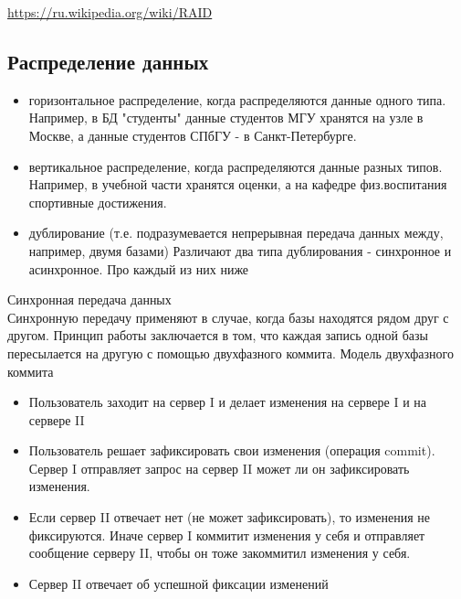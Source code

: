 \url{https://ru.wikipedia.org/wiki/RAID}

\subsection {Распределение данных}

\begin{itemize}
\item горизонтальное распределение, когда распределяются данные одного типа. Например, в БД "студенты" данные студентов МГУ хранятся на узле в Москве, а данные студентов СПбГУ - в Санкт-Петербурге. 

\item вертикальное распределение, когда распределяются данные разных типов. Например, в учебной части хранятся оценки, а на кафедре физ.воспитания спортивные достижения. 

\item дублирование (т.е. подразумевается непрерывная передача данных между, например, двумя базами) Различают два типа дублирования - синхронное и асинхронное. Про каждый из них ниже
\end{itemize}

Синхронная передача данных \\
Синхронную передачу применяют в случае, когда базы находятся рядом друг с другом. Принцип работы заключается в том, что каждая запись одной базы пересылается на другую с помощью двухфазного коммита. 
Модель двухфазного коммита
\begin {itemize}
\item Пользователь заходит на сервер I и делает изменения на сервере I и на сервере II
\item Пользователь решает зафиксировать свои изменения (операция commit). Сервер I отправляет запрос на сервер II может ли он зафиксировать изменения.
\item Если сервер II отвечает нет (не может зафиксировать), то изменения не фиксируются. Иначе сервер I коммитит изменения у себя и отправляет сообщение серверу II, чтобы он тоже закоммитил изменения у себя. 
\item Сервер II отвечает об успешной фиксации изменений
\end {itemize}


